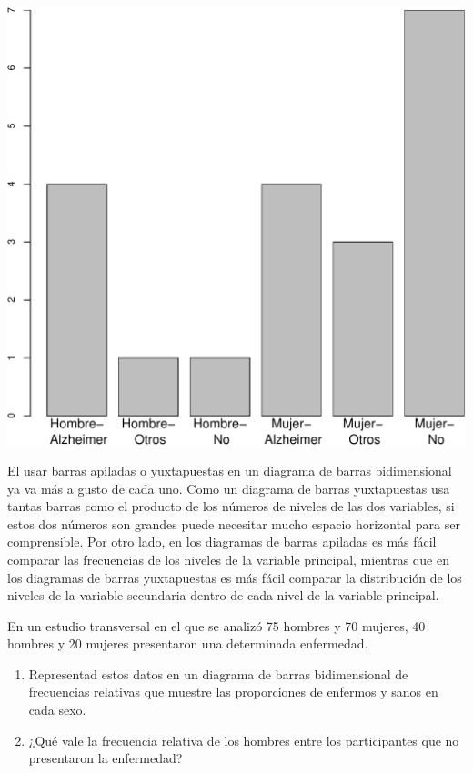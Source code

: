 \documentclass[
]{book}
\theoremstyle{definition}
\theoremstyle{definition}
\theoremstyle{definition}
\theoremstyle{definition}
\theoremstyle{remark}
\begin{document}
\begin{center}\includegraphics[width=0.75\linewidth]{INREMDN_files/figure-latex/unnamed-chunk-233-1} \end{center}

El usar barras apiladas o yuxtapuestas en un diagrama de barras bidimensional ya va más a gusto de cada uno. Como un diagrama de barras yuxtapuestas usa tantas barras como el producto de los números de niveles de las dos variables, si estos dos números son grandes puede necesitar mucho espacio horizontal para ser comprensible. Por otro lado, en los diagramas de barras apiladas es más fácil comparar las frecuencias de los niveles de la variable principal, mientras que en los diagramas de barras yuxtapuestas es más fácil comparar la distribución de los niveles de la variable secundaria dentro de cada nivel de la variable principal.

\begin{rmdexercici}
En un estudio transversal en el que se analizó 75 hombres y 70 mujeres, 40 hombres y 20 mujeres presentaron una determinada enfermedad.

\begin{enumerate}
\def\labelenumi{\alph{enumi}.}
\item
  Representad estos datos en un diagrama de barras bidimensional de frecuencias relativas que muestre las proporciones de enfermos y sanos en cada sexo.
\item
  ¿Qué vale la frecuencia relativa de los hombres entre los participantes que no presentaron la enfermedad?
\end{enumerate}
\end{rmdexercici}
\end{document}
